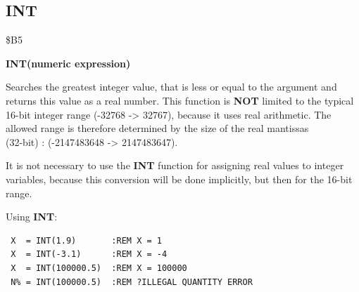 
\newpage
\subsection{INT}
\begin{description}[leftmargin=2cm,style=nextline]
\item [Token:] \$B5
\item [Format:] {\bf INT(numeric expression)}
\item [Usage:] Searches the greatest
               integer value, that is less or equal to the argument
               and returns this value as a real number.
               This function is {\bf NOT} limited to the typical
               16-bit integer range (-32768 -> 32767), because
               it uses real arithmetic. The allowed range is
               therefore determined by the size of the real
               mantissas \\
               (32-bit) : (-2147483648 -> 2147483647).

\item [Remarks:] It is not necessary to use the {\bf INT}
               function for assigning real values to integer
               variables, because this conversion will be done
               implicitly, but then for the 16-bit range.

\item [Example:] Using {\bf INT}:
\begin{tcolorbox}[colback=black,coltext=white]
\verbatimfont{\codefont}
\begin{verbatim}
 X  = INT(1.9)       :REM X = 1
 X  = INT(-3.1)      :REM X = -4
 X  = INT(100000.5)  :REM X = 100000
 N% = INT(100000.5)  :REM ?ILLEGAL QUANTITY ERROR
\end{verbatim}
\end{tcolorbox}
\end{description}


\newpage
